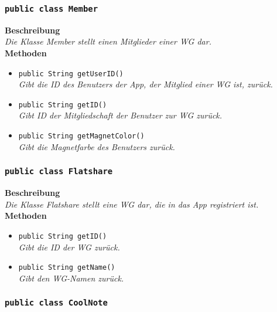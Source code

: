 	

\subsubsection{\texttt{public class Member}}

	\textbf{Beschreibung} \\
	\textit{Die Klasse Member stellt einen Mitglieder einer WG dar.} \\

	\textbf{Methoden}
	\begin{itemize}
		\item\texttt{{public String getUserID()}}\\
		\textit{Gibt die ID des Benutzers der App, der Mitglied einer WG ist, zurück.}\\
		\item\texttt{{public String getID()}}\\
		\textit{Gibt ID der Mitgliedschaft der Benutzer zur WG zurück.}\\
		\item\texttt{{public String getMagnetColor()}}\\
		\textit{Gibt die Magnetfarbe des Benutzers zurück.}\\
	\end{itemize}       

\subsubsection{\texttt{public class Flatshare}}

	\textbf{Beschreibung} \\
	\textit{Die Klasse Flatshare stellt eine WG dar, die in das App registriert ist.} \\

	\textbf{Methoden}
	\begin{itemize}
		\item\texttt{{public String getID()}}\\
		\textit{Gibt die ID der WG zurück.}\\
		\item\texttt{{public String getName()}}\\
		\textit{Gibt den WG-Namen zurück.}\\
	\end{itemize}

\subsubsection{\texttt{public class CoolNote}}

